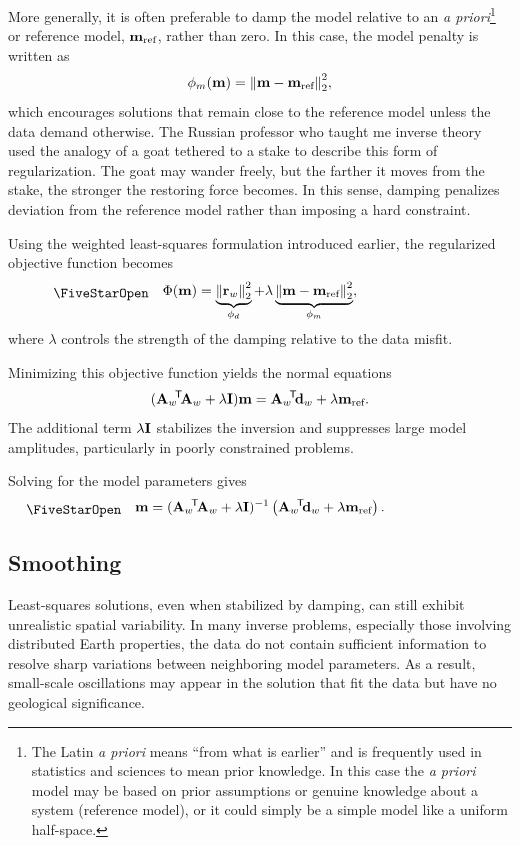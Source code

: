 More generally, it is often preferable to damp the model relative to an \textit{a priori}\footnote{The Latin \textit{a priori} means ``from what is earlier'' and is frequently used in statistics and sciences to mean prior knowledge.  In this case the \textit{a priori} model may be based on prior assumptions or genuine knowledge about a system (reference model), or it could simply be a simple model like a uniform half-space.}
or reference model, $\vb{m}_\text{ref}$, rather than zero. In this case, the model penalty is written as
\[
    \phi_m(\vb{m}) = \norm{\vb{m} - \vb{m}_\text{ref}}_2^2,
\]
which encourages solutions that remain close to the reference model unless the data demand otherwise. The Russian professor who taught me inverse theory used the analogy of a goat tethered to a stake to describe this form of regularization. The goat may wander freely, but the farther it moves from the stake, the stronger the restoring force becomes. In this sense, damping penalizes deviation from the reference model rather than imposing a hard constraint.

Using the weighted least-squares formulation introduced earlier, the regularized objective function becomes
\begin{equation}
    \workeq
    \Phi(\vb{m}) = \underbrace{\norm{\vb{r}_w}_2^2}_{\phi_d} + \lambda \underbrace{\norm{\vb{m} - \vb{m}_\text{ref}}_2^2}_{\phi_m},
\end{equation}
where $\lambda$ controls the strength of the damping relative to the data misfit.

Minimizing this objective function yields the normal equations
\[
    (\vb{A}_w\!^\mathsf{T}\! \vb{A}_w + \lambda \vb{I}) \vb{m} =
    \vb{A}_w\!^\mathsf{T}\! \vb{d}_w + \lambda \vb{m}_\text{ref}.
\]
The additional term $\lambda \vb{I}$ stabilizes the inversion and suppresses large model amplitudes, particularly in poorly constrained problems.

Solving for the model parameters gives
\begin{equation}
    \workeq
    \vb{m} = (\vb{A}_w\T \vb{A}_w + \lambda \vb{I})^{-1}
    \left(
        \vb{A}_w\T \vb{d}_w + \lambda \vb{m}_\text{ref}
    \right).
\end{equation}

\subsection{Smoothing}

Least-squares solutions, even when stabilized by damping, can still exhibit unrealistic spatial variability. In many inverse problems, especially those involving distributed Earth properties, the data do not contain sufficient information to resolve sharp variations between neighboring model parameters. As a result, small-scale oscillations may appear in the solution that fit the data but have no geological significance.

